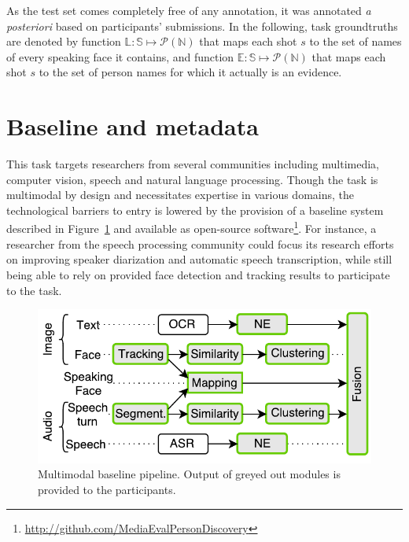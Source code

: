 \documentclass{acm_proc_article-me}
\newcommand\refEvidences{\mathbb{E}}
\newcommand\refLabels{\mathbb{L}}
\newcommand\refNames{\mathbb{N}}
\newcommand\shots{\mathbb{S}}
\begin{document}
As the test set comes completely free of any annotation, it was annotated \emph{a posteriori} based on participants' submissions. In the following, task groundtruths are denoted by function $\refLabels : \shots \mapsto \mathcal{P}(\refNames)$ that maps each shot $s$ to the set of names of every speaking face it contains, and function $\refEvidences : \shots \mapsto \mathcal{P}(\refNames)$ that maps each shot $s$ to the set of person names for which it actually is an evidence.

\section{Baseline and metadata}

This task targets researchers from several communities including multimedia, computer vision, speech and natural language processing. Though the task is multimodal by design and necessitates expertise in various domains, the technological barriers to entry is lowered by the provision of a baseline system described in Figure~\ref{fig:baseline} and available as open-source software\footnote{\url{http://github.com/MediaEvalPersonDiscovery}}.
For instance, a researcher from the speech processing community could focus its research efforts on improving speaker diarization and automatic speech transcription, while still being able to rely on provided face detection and tracking results to participate to the task.

\begin{figure}[htb]
 \centering
 \includegraphics[width=0.95\linewidth]{figs/baseline.pdf}
 \vspace{-0.6cm}
 \caption{Multimodal baseline pipeline. Output of greyed out modules is provided to the participants.}
 \label{fig:baseline}
\end{figure}
\end{document}
